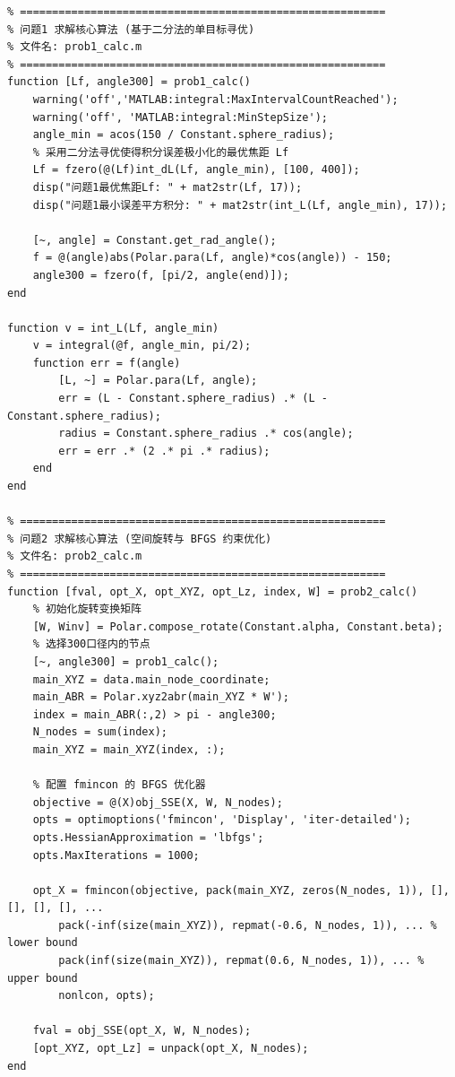 \documentclass[UTF8,a4paper,zihao=-4]{ctexart}
\begin{document}
\begin{lstlisting}
% =========================================================
% 问题1 求解核心算法 (基于二分法的单目标寻优)
% 文件名: prob1_calc.m
% =========================================================
function [Lf, angle300] = prob1_calc()
    warning('off','MATLAB:integral:MaxIntervalCountReached');
    warning('off', 'MATLAB:integral:MinStepSize');
    angle_min = acos(150 / Constant.sphere_radius);
    % 采用二分法寻优使得积分误差极小化的最优焦距 Lf
    Lf = fzero(@(Lf)int_dL(Lf, angle_min), [100, 400]);
    disp("问题1最优焦距Lf: " + mat2str(Lf, 17));
    disp("问题1最小误差平方积分: " + mat2str(int_L(Lf, angle_min), 17));
    
    [~, angle] = Constant.get_rad_angle();
    f = @(angle)abs(Polar.para(Lf, angle)*cos(angle)) - 150;
    angle300 = fzero(f, [pi/2, angle(end)]);
end

function v = int_L(Lf, angle_min)
    v = integral(@f, angle_min, pi/2);
    function err = f(angle)
        [L, ~] = Polar.para(Lf, angle);
        err = (L - Constant.sphere_radius) .* (L - Constant.sphere_radius);
        radius = Constant.sphere_radius .* cos(angle);
        err = err .* (2 .* pi .* radius);
    end
end

% =========================================================
% 问题2 求解核心算法 (空间旋转与 BFGS 约束优化)
% 文件名: prob2_calc.m
% =========================================================
function [fval, opt_X, opt_XYZ, opt_Lz, index, W] = prob2_calc()
    % 初始化旋转变换矩阵
    [W, Winv] = Polar.compose_rotate(Constant.alpha, Constant.beta);
    % 选择300口径内的节点
    [~, angle300] = prob1_calc();
    main_XYZ = data.main_node_coordinate;
    main_ABR = Polar.xyz2abr(main_XYZ * W');
    index = main_ABR(:,2) > pi - angle300;
    N_nodes = sum(index);
    main_XYZ = main_XYZ(index, :);
    
    % 配置 fmincon 的 BFGS 优化器
    objective = @(X)obj_SSE(X, W, N_nodes);
    opts = optimoptions('fmincon', 'Display', 'iter-detailed');
    opts.HessianApproximation = 'lbfgs';
    opts.MaxIterations = 1000;
    
    opt_X = fmincon(objective, pack(main_XYZ, zeros(N_nodes, 1)), [], [], [], [], ...
        pack(-inf(size(main_XYZ)), repmat(-0.6, N_nodes, 1)), ... % lower bound
        pack(inf(size(main_XYZ)), repmat(0.6, N_nodes, 1)), ... % upper bound
        nonlcon, opts);
        
    fval = obj_SSE(opt_X, W, N_nodes);
    [opt_XYZ, opt_Lz] = unpack(opt_X, N_nodes);
end


\end{lstlisting}
\end{document}
